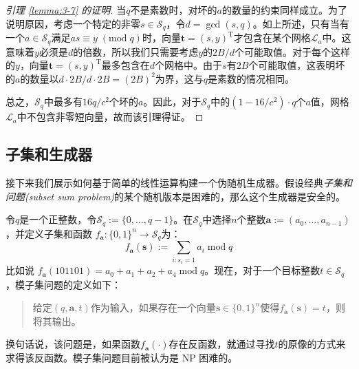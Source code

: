 \begin{proof}[引理 \ref{lemma:3-7} 的证明]
当$q$不是素数时，对坏的$a$的数量的约束同样成立。为了说明原因，考虑一个特定的非零$s\in\mathcal{S}_q$，令$d=\gcd(s, q)$。如上所述，只有当有一个$a\in\mathcal{S}_q$满足$as\equiv y\;(\mathrm{mod}\;q)$时，向量$\boldsymbol{t}=(s,y)^\mathrm{T}$才包含在某个网格$\mathcal{L}_a$中。这意味着$y$必须是$d$的倍数，所以我们只需要考虑$y$的$2B/d$个可能取值。对于每个这样的$y$，向量$\boldsymbol{t}=(s,y)^\mathrm{T}$最多包含在$d$个网格中。由于$s$有$2B$个可能取值，这表明坏的$a$的数量以$d\cdot 2B/d \cdot 2B=(2B)^2$为界，这与$q$是素数的情况相同。

总之，$\mathcal{S}_q$中最多有$16q/c^2$个坏的$a$。因此，对于$\mathcal{S}_q$中的$(1-16/c^2)\cdot q$个$a$值，网格$\mathcal{L}_a$中不包含非零短向量，故而该引理得证。
\end{proof}

\subsection{子集和生成器}

接下来我们展示如何基于简单的线性运算构建一个伪随机生成器。假设经典\emph{子集和问题(subset sum problem)}的某个随机版本是困难的，那么这个生成器是安全的。

\begin{snote}[模子集问题。]
令$q$是一个正整数，令$\mathcal{S}_q:=\{0,\dots,q-1\}$。在$\mathcal{S}_q$中选择$n$个整数$\boldsymbol{a}:=(a_0,\dots,a_{n-1})$，并定义子集和函数 $f_{\boldsymbol{a}}:\{0,1\}^n\to\mathcal{S}_q$为：
\[
f_{\boldsymbol{a}}(\boldsymbol{s}):=\sum_{i:s_i=1}a_i\;\mathrm{mod}\;q
\]
比如说 $f_{\boldsymbol{a}}(101101)=a_0+a_1+a_2+a_4\;\mathrm{mod}\;q$。现在，对于一个目标整数$t\in\mathcal{S}_q$，模子集问题的定义如下：
\begin{quote}
给定$(q,\boldsymbol{a},t)$作为输入，如果存在一个向量$\boldsymbol{s}\in\{0,1\}^n$使得$f_{\boldsymbol{a}}(\boldsymbol{s})=t$，则将其输出。
\end{quote}
换句话说，该问题是，如果函数$f_{\boldsymbol{a}}(\cdot)$存在反函数，就通过寻找$t$的原像的方式来求得该反函数。模子集问题目前被认为是 NP 困难的。
\end{snote}


